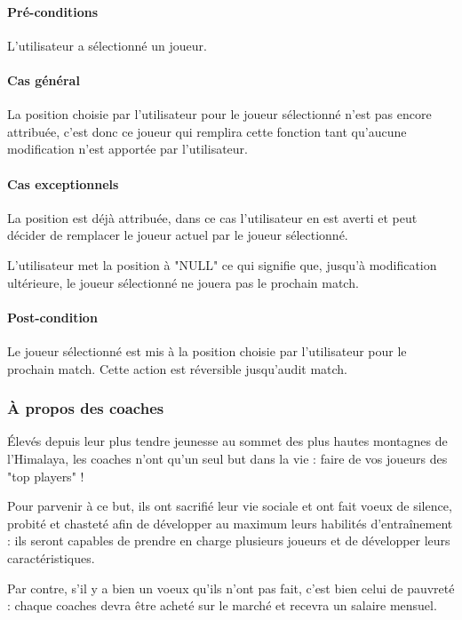 \paragraph{Pré-conditions}
L'utilisateur a sélectionné un joueur.
\paragraph{Cas général}
La position choisie par l'utilisateur pour le joueur sélectionné n'est pas encore attribuée, c'est donc ce joueur qui remplira cette fonction tant qu'aucune modification n'est apportée par l'utilisateur.
\paragraph{Cas exceptionnels}
\begin{list}{}{\leftmargin=1.5em}
\item{La position est déjà attribuée, dans ce cas l'utilisateur en est averti et peut décider de remplacer le joueur actuel par le joueur sélectionné.}
\item{L'utilisateur met la position à "NULL" ce qui signifie que, jusqu'à modification ultérieure, le joueur sélectionné ne jouera pas le prochain match.}
\end{list}
\paragraph{Post-condition}
Le joueur sélectionné est mis à la position choisie par l'utilisateur pour le prochain match. Cette action est réversible jusqu'audit match.

\subsubsection{À propos des coaches}
Élevés depuis leur plus tendre jeunesse au sommet des plus hautes montagnes de l'Himalaya, les coaches n'ont qu'un seul but dans la vie : faire de vos joueurs des "top players" !

Pour parvenir à ce but, ils ont sacrifié leur vie sociale et ont fait voeux de silence, probité et chasteté afin de développer au maximum leurs habilités d'entraînement : ils seront capables de prendre en charge plusieurs joueurs et de développer leurs caractéristiques.

Par contre, s'il y a bien un voeux qu'ils n'ont pas fait, c'est bien celui de pauvreté : chaque coaches devra être acheté sur le marché et recevra un salaire mensuel.


